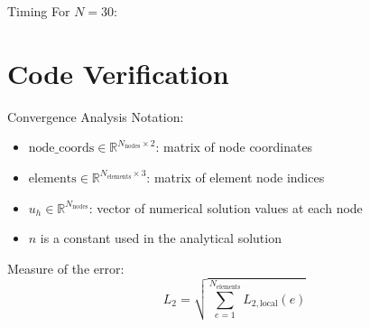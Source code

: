 \documentclass{beamer}
\begin{document}
\begin{frame}{Timing}
For $N=30$:
\begin{table}[ht]
    \centering
\end{table}
    
\end{frame}

\section{Code Verification}
\begin{frame}{Convergence Analysis}
Notation:
\begin{itemize}
    \item \( \text{node\_coords} \in \mathbb{R}^{N_{\text{nodes}} \times 2} \): matrix of node coordinates
    \item \( \text{elements} \in \mathbb{R}^{N_{\text{elements}} \times 3} \): matrix of element node indices
    \item \( u_h \in \mathbb{R}^{N_{\text{nodes}}} \): vector of numerical solution values at each node
    \item \( n \) is a constant used in the analytical solution
\end{itemize}

Measure of the error:
    \[
    L_2 = \sqrt{\sum_{e=1}^{N_{\text{elements}}} L_{2, \text{local}}(e)}
    \]
\end{frame}
\end{document}
